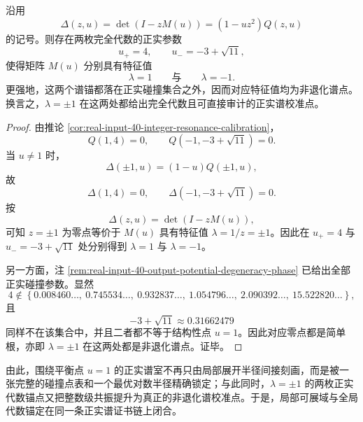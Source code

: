 \begin{theorem}\label{thm:xi-time-part68aa-output-algebraic-plusminus-one-nondegenerate-anchors}
沿用
\[
\Delta(z,u)=\det(I-zM(u))=(1-uz^2)Q(z,u)
\]
的记号。则存在两枚完全代数的正实参数
\[
u_+=4,
\qquad
u_-=-3+\sqrt{11},
\]
使得矩阵 \(M(u)\) 分别具有特征值
\[
\lambda=1
\qquad\text{与}\qquad
\lambda=-1.
\]
更强地，这两个谱锚都落在正实碰撞集合之外，因而对应特征值均为非退化谱点。换言之，\(\lambda=\pm1\) 在这两处都给出完全代数且可直接审计的正实谱校准点。
\end{theorem}
\begin{proof}
由推论 \ref{cor:real-input-40-integer-resonance-calibration}，
\[
Q(1,4)=0,
\qquad
Q(-1,-3+\sqrt{11})=0.
\]
当 \(u\neq 1\) 时，
\[
\Delta(\pm1,u)=(1-u)Q(\pm1,u),
\]
故
\[
\Delta(1,4)=0,
\qquad
\Delta(-1,-3+\sqrt{11})=0.
\]
按
\[
\Delta(z,u)=\det(I-zM(u)),
\]
可知 \(z=\pm1\) 为零点等价于 \(M(u)\) 具有特征值 \(\lambda=1/z=\pm1\)。因此在 \(u_+=4\) 与 \(u_-=-3+\sqrt{11}\) 处分别得到 \(\lambda=1\) 与 \(\lambda=-1\)。

另一方面，注 \ref{rem:real-input-40-output-potential-degeneracy-phase} 已给出全部正实碰撞参数。显然
\[
4\notin
\left\{
0.008460\ldots,\ 0.745534\ldots,\ 0.932837\ldots,\ 1.054796\ldots,\ 2.090392\ldots,\ 15.522820\ldots
\right\},
\]
且
\[
-3+\sqrt{11}\approx 0.31662479
\]
同样不在该集合中，并且二者都不等于结构性点 \(u=1\)。因此对应零点都是简单根，亦即 \(\lambda=\pm1\) 在这两处都是非退化谱点。证毕。
\end{proof}

\noindent
由此，围绕平衡点 \(u=1\) 的正实谱室不再只由局部展开半径间接刻画，而是被一张完整的碰撞点表和一个最优对数半径精确锁定；与此同时，\(\lambda=\pm1\) 的两枚正实代数锚点又把整数级共振提升为真正的非退化谱校准点。于是，局部可展域与全局代数锚定在同一条正实谱证书链上闭合。

\endinput
